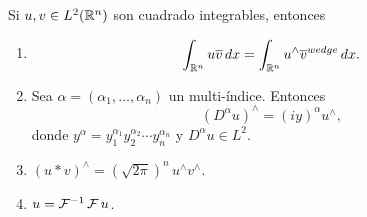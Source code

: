 \documentclass[../edp.tex]{subfiles}
\begin{document}
\begin{Teorema}
	Si \(u, v \in L^2(\mathbb{R}^n)\) son cuadrado integrables, entonces
	\begin{enumerate}[itemsep=2pt,topsep=3pt]
		\item 
		\begin{displaymath}
			\int_{\mathbb{R}^n} u \overline{v} \, dx
			=
			\int_{\mathbb{R}^n} u^{\wedge} \overline{v}^{wedge} \, dx.
		\end{displaymath}

		\item Sea \(\alpha = (\alpha_1, \dots, \alpha_n)\) un
		multi-índice. Entonces 
		\begin{displaymath}
			\left(D^{\alpha} u\right)^{\wedge}
			=
			(iy)^{\alpha} u^{\wedge},
		\end{displaymath}
		donde \(y^{\alpha} = y_1^{\alpha_1} y_2^{\alpha_2} \cdots
		y_n^{\alpha_n}\) y \(D^{\alpha} u \in L^{2}\).

		\item \((u\ast v)^{\wedge} = (\sqrt{2\pi})^n\, u^{\wedge}
		v^{\wedge}\).

		\item \(u = \mathcal{F}^{-1} \, \mathcal{F}\, u\).
	\end{enumerate}
	
\end{Teorema}
\end{document}
